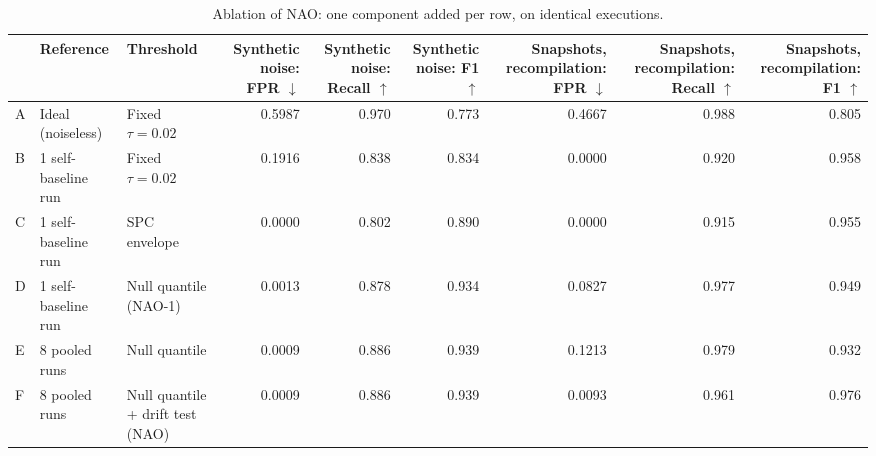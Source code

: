 \begin{table}[t]
\centering
\caption{Ablation of NAO: one component added per row, on identical executions.}
\label{tab:rq4-ablation}
\small
\begin{tabular}{lllrrrrrr}
\toprule
 & Reference & Threshold & Synthetic noise: FPR $\downarrow$ & Synthetic noise: Recall $\uparrow$ & Synthetic noise: F1 $\uparrow$ & Snapshots, recompilation: FPR $\downarrow$ & Snapshots, recompilation: Recall $\uparrow$ & Snapshots, recompilation: F1 $\uparrow$ \\
\midrule
A & Ideal (noiseless) & Fixed $\tau = 0.02$ & 0.5987 & 0.970 & 0.773 & 0.4667 & 0.988 & 0.805 \\
B & 1 self-baseline run & Fixed $\tau = 0.02$ & 0.1916 & 0.838 & 0.834 & 0.0000 & 0.920 & 0.958 \\
C & 1 self-baseline run & SPC envelope & 0.0000 & 0.802 & 0.890 & 0.0000 & 0.915 & 0.955 \\
D & 1 self-baseline run & Null quantile (NAO-1) & 0.0013 & 0.878 & 0.934 & 0.0827 & 0.977 & 0.949 \\
E & 8 pooled runs & Null quantile & 0.0009 & 0.886 & 0.939 & 0.1213 & 0.979 & 0.932 \\
F & 8 pooled runs & Null quantile + drift test (NAO) & 0.0009 & 0.886 & 0.939 & 0.0093 & 0.961 & 0.976 \\
\bottomrule
\end{tabular}
\end{table}
